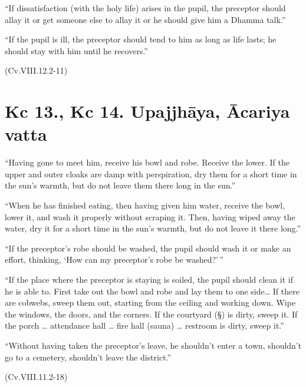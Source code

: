 ``If dissatisfaction (with the holy life) arises in the pupil, the
preceptor should allay it or get someone else to allay it or he should
give him a Dhamma talk.''

``If the pupil is ill, the preceptor should tend to him as long as life
lasts; he should stay with him until he recovers.''

(Cv.VIII.12.2-11)

\section{Kc 13., Kc 14. Upajjhāya, Ācariya vatta}

``Having gone to meet him, receive his bowl and robe. Receive the lower.
If the upper and outer cloaks are damp with perspiration, dry them for a
short time in the sun's warmth, but do not leave them there long in the
sun.''

``When he has finished eating, then having given him water, receive the
bowl, lower it, and wash it properly without scraping it. Then, having
wiped away the water, dry it for a short time in the sun's warmth, but
do not leave it there long.''

``If the preceptor's robe should be washed, the pupil should wash it or
make an effort, thinking, `How can my preceptor's robe be washed?'\,''

``If the place where the preceptor is staying is soiled, the pupil
should clean it if he is able to. First take out the bowl and robe and
lay them to one side\ldots{} If there are cobwebs, sweep them out,
starting from the ceiling and working down. Wipe the windows, the doors,
and the corners. If the courtyard (§) is dirty, sweep it. If the porch
\ldots{} attendance hall \ldots{} fire hall (sauna) \ldots{} restroom is
dirty, sweep it.''

``Without having taken the preceptor's leave, he shouldn't enter a town,
shouldn't go to a cemetery, shouldn't leave the district.''

(Cv.VIII.11.2-18)

